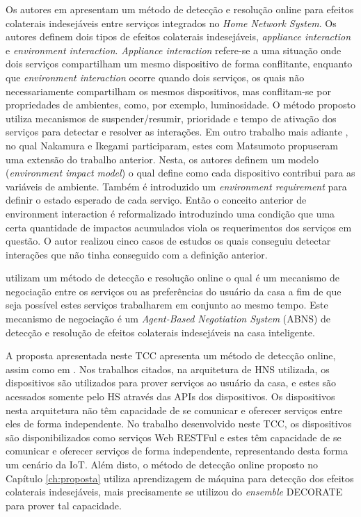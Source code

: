 Os autores em \cite{Nakamura:2009} apresentam um método de detecção e resolução online para efeitos colaterais indesejáveis entre serviços integrados no \textit{Home Network System}. Os autores definem dois tipos de efeitos colaterais indesejáveis, \textit{appliance interaction} e \textit{environment interaction}. \textit{Appliance interaction} refere-se a uma situação onde dois serviços compartilham um mesmo dispositivo de forma conflitante, enquanto que \textit{environment interaction} ocorre quando dois serviços, os quais não necessariamente compartilham os mesmos dispositivos, mas conflitam-se por propriedades de ambientes, como, por exemplo, luminosidade. O método proposto utiliza mecanismos de suspender/resumir, prioridade e tempo de ativação dos serviços para detectar e resolver as interações. Em outro trabalho mais adiante \cite{Ikegami:2013}, no qual Nakamura e Ikegami participaram, estes com Matsumoto propuseram uma extensão do trabalho anterior. Nesta, os autores definem um modelo (\textit{environment impact model}) o qual define como cada dispositivo contribui para as variáveis de ambiente. Também é introduzido um \textit{environment requirement} para definir o estado esperado de cada serviço. Então  o conceito anterior de environment interaction é reformalizado introduzindo uma condição que uma certa quantidade de impactos acumulados viola os requerimentos dos serviços em questão. O autor realizou cinco casos de estudos os quais conseguiu detectar interações que não tinha conseguido com a definição anterior.

\cite{Alfakeeh:2016} utilizam um método de detecção e resolução online o qual é um mecanismo de negociação entre os serviços ou as preferências do usuário da casa a fim de que seja possível estes serviços trabalharem em conjunto ao mesmo tempo. Este mecanismo de negociação é um \textit{Agent-Based Negotiation System} (ABNS) de detecção e resolução de efeitos colaterais indesejáveis na casa inteligente.

A proposta apresentada neste TCC apresenta um método de detecção online, assim como em \cite{Wilson:2008, Nakamura:2009, Ikegami:2013, Alfakeeh:2016}. Nos trabalhos citados, na arquitetura de HNS utilizada, os dispositivos são utilizados para prover serviços ao usuário da casa, e estes são acessados somente pelo HS através das APIs dos dispositivos. Os dispositivos nesta arquitetura não têm capacidade de se comunicar e oferecer serviços entre eles de forma independente. No trabalho desenvolvido neste TCC, os dispositivos são disponibilizados como serviços Web RESTFul e estes têm capacidade de se comunicar e oferecer serviços de forma independente, representando desta forma um cenário da IoT. Além disto, o método de detecção online proposto no Capítulo \ref{ch:proposta} utiliza aprendizagem de máquina para detecção dos efeitos colaterais indesejáveis, mais precisamente se utilizou do \textit{ensemble} DECORATE para prover tal capacidade.
